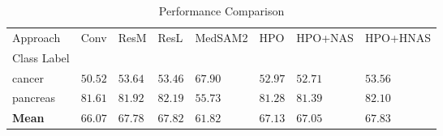 \begin{table}
\caption{Performance Comparison}
\label{tab:results}
\begin{tabular}{llllllll}
\toprule
Approach & Conv & ResM & ResL & MedSAM2 & HPO & HPO+NAS & HPO+HNAS \\
Class Label &  &  &  &  &  &  &  \\
\midrule
cancer & $50.52$ & $53.64$ & $53.46$ & $\mathbf{67.90}$ & $52.97$ & $52.71$ & $53.56$ \\
pancreas & $81.61$ & $81.92$ & $\mathbf{82.19}$ & $55.73$ & $81.28$ & $81.39$ & $82.10$ \\
\textbf{Mean} & $66.07$ & $67.78$ & $67.82$ & $61.82$ & $67.13$ & $67.05$ & $\mathbf{67.83}$ \\
\bottomrule
\end{tabular}
\end{table}

